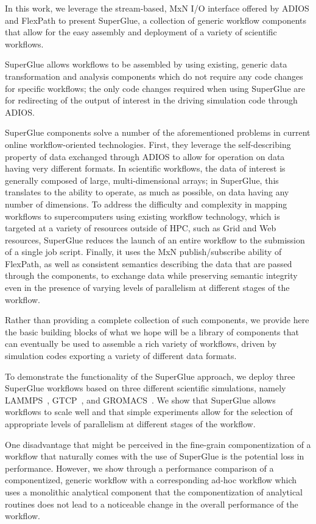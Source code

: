 In this work, we leverage the stream-based, MxN
I/O interface offered by ADIOS and FlexPath
to present SuperGlue, a collection of generic workflow components
that allow for the easy assembly and deployment
of a variety of scientific workflows.

SuperGlue allows workflows to be assembled
by using existing, generic
data transformation and 
analysis components
which do not require any code changes
for specific workflows;
the only code changes required when
using SuperGlue are 
for redirecting of the output of interest
in the driving simulation code through ADIOS.

SuperGlue components solve a number of the aforementioned problems in
current online workflow-oriented technologies.
First, they leverage the self-describing
property of data exchanged through ADIOS to
allow for operation on data having very different formats.
In scientific workflows, the data of interest
is generally composed of large, multi-dimensional
arrays; in SuperGlue, this translates to
the ability to operate, as much as possible,
on data having any number of dimensions.
To address the difficulty and complexity
in mapping workflows to supercomputers using
existing workflow technology, which is targeted
at a variety of resources outside of HPC, such as Grid and Web
resources,
SuperGlue reduces the
launch of an entire workflow to the submission of a single job script.
Finally, it uses the MxN publish/subscribe
ability of FlexPath,
as well as consistent semantics describing
the data that are passed through the components,
to exchange data while preserving semantic integrity
even in the presence of varying levels of parallelism 
at different stages of the workflow.

Rather than providing a complete collection of such components,
we provide here the basic building
blocks of what we hope will be a library of components that can
eventually be used to assemble
a rich variety of workflows, driven by simulation codes
exporting a variety of different data formats.

To demonstrate the functionality of the SuperGlue approach,
we deploy three SuperGlue workflows based on three different
scientific simulations, namely
LAMMPS~\cite{plimpton:1997:lammps},
GTCP~\cite{lin:gtc},
and GROMACS~\cite{hess2008gromacs}.
We show that SuperGlue allows workflows to scale well and that
simple experiments allow for the selection of
appropriate levels of parallelism at different
stages of the workflow.

One disadvantage that might be perceived in the fine-grain componentization
of a workflow that naturally comes with the use of SuperGlue
is the potential loss in performance.
However, we show through a performance comparison of
a componentized, generic workflow with a corresponding
ad-hoc workflow which uses a monolithic analytical component
that the componentization of analytical routines
does not lead to a noticeable change in the
overall performance of the workflow.


